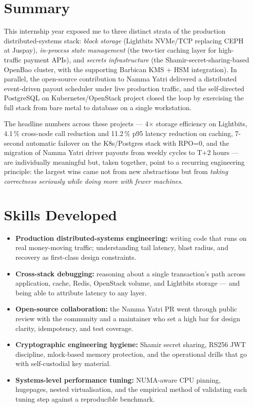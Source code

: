 \documentclass[12pt,a4paper,oneside]{report}
\begin{document}
\section{Summary}

This internship year exposed me to three distinct strata of the production distributed-systems stack: \emph{block storage} (Lightbits NVMe/TCP replacing CEPH at Juspay), \emph{in-process state management} (the two-tier caching layer for high-traffic payment APIs), and \emph{secrets infrastructure} (the Shamir-secret-sharing-based OpenBao cluster, with the supporting Barbican KMS + HSM integration). In parallel, the open-source contribution to Namma Yatri delivered a distributed event-driven payout scheduler under live production traffic, and the self-directed PostgreSQL on Kubernetes/OpenStack project closed the loop by exercising the full stack from bare metal to database on a single workstation.

The headline numbers across these projects --- 4$\times$ storage efficiency on Lightbits, 4.1\,\% cross-node call reduction and 11.2\,\% p95 latency reduction on caching, 7-second automatic failover on the K8s/Postgres stack with RPO=0, and the migration of Namma Yatri driver payouts from weekly cycles to T+2 hours --- are individually meaningful but, taken together, point to a recurring engineering principle: the largest wins came not from new abstractions but from \emph{taking correctness seriously while doing more with fewer machines}.

\section{Skills Developed}

\begin{itemize}[leftmargin=*]
    \item \textbf{Production distributed-systems engineering:} writing code that runs on real money-moving traffic; understanding tail latency, blast radius, and recovery as first-class design constraints.
    \item \textbf{Cross-stack debugging:} reasoning about a single transaction's path across application, cache, Redis, OpenStack volume, and Lightbits storage --- and being able to attribute latency to any layer.
    \item \textbf{Open-source collaboration:} the Namma Yatri PR went through public review with the community and a maintainer who set a high bar for design clarity, idempotency, and test coverage.
    \item \textbf{Cryptographic engineering hygiene:} Shamir secret sharing, RS256 JWT discipline, mlock-based memory protection, and the operational drills that go with self-custodial key material.
    \item \textbf{Systems-level performance tuning:} NUMA-aware CPU pinning, hugepages, nested virtualisation, and the empirical method of validating each tuning step against a reproducible benchmark.
\end{itemize}
\end{document}
